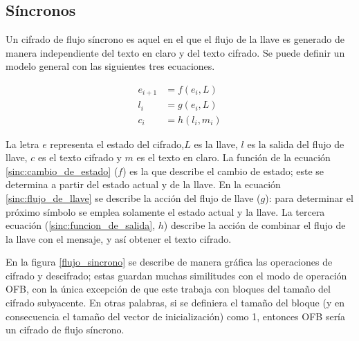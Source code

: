 %
%

\subsection{Síncronos}

Un cifrado de flujo síncrono es aquel en el que el flujo de la llave es
generado de manera independiente del texto en claro y del texto cifrado. Se
puede definir un modelo general con las siguientes tres ecuaciones.

\begin{align}
  \label{sinc:cambio_de_estado}
  e_{i+1} &= f(e_i, L) \\
  \label{sinc:flujo_de_llave}
  l_i &= g(e_i, L) \\
  \label{sinc:funcion_de_salida}
  c_i &= h(l_i, m_i)
\end{align}

La letra $ e $ representa el estado del cifrado,$ L $ es la llave, $ l $ es
la salida del flujo de llave, $ c $ es el texto cifrado y $ m $ es el texto en
claro. La función de la ecuación \ref{sinc:cambio_de_estado} ($ f $) es la que
describe el cambio de estado; este se determina a partir del estado actual y
de la llave. En la ecuación \ref{sinc:flujo_de_llave} se describe la acción del
flujo de llave ($ g $): para determinar el próximo símbolo se emplea solamente
el estado actual y la llave. La tercera ecuación (\ref{sinc:funcion_de_salida},
$ h $) describe la acción de combinar el flujo de la llave con el mensaje, y
así obtener el texto cifrado.


En la figura \ref{flujo_sincrono} se describe de manera gráfica las operaciones
de cifrado y descifrado; estas guardan muchas similitudes con el modo de
operación OFB, con la única excepción de que este trabaja con bloques del tamaño
del cifrado subyacente. En otras palabras, si se definiera el tamaño del bloque
(y en consecuencia el tamaño del vector de inicialización) como 1, entonces
OFB sería un cifrado de flujo síncrono.

